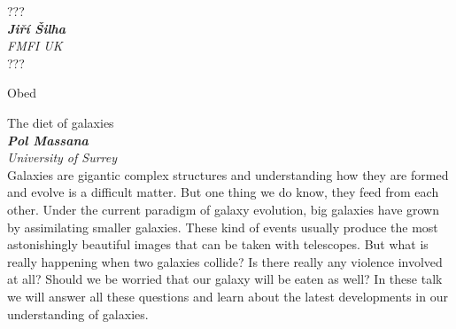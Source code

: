 \documentclass[a4paper]{report}
\begin{document}
                    \begin{tcolorbox}[
                                    colback=blue!10,
                    colframe=black!50!blue,
                                fonttitle=\Large\bfseries,
                title=11:30
            ]
                {\Large ???}
                                                            \\ \textbf{\textit{Jiří Šilha}}
                                        \\ \textit{FMFI UK}                                \\[2ex]???
            \end{tcolorbox}
                    \begin{tcolorbox}[
                                    colback=red!10,
                    colframe=red!50!black,
                                fonttitle=\Large\bfseries,
                title=12:30
            ]
                {\Large Obed}
                                            \end{tcolorbox}
                    \begin{tcolorbox}[
                                    colback=white,
                    colframe=black!70!white,
                                fonttitle=\Large\bfseries,
                title=16:30
            ]
                {\Large The diet of galaxies}
                                                            \\ \textbf{\textit{Pol Massana}}
                                        \\ \textit{University of Surrey}                                \\[2ex]Galaxies are gigantic complex structures and understanding how they are formed and evolve is a difficult matter. But one thing we do know, they feed from each other. Under the current paradigm of galaxy evolution, big galaxies have grown by assimilating smaller galaxies. These kind of events usually produce the most astonishingly beautiful images that can be taken with telescopes. But what is really happening when two galaxies collide? Is there really any violence involved at all? Should we be worried that our galaxy will be eaten as well? In these talk we will answer all these questions and learn about the latest developments in our understanding of galaxies.
            \end{tcolorbox}
\end{document}
